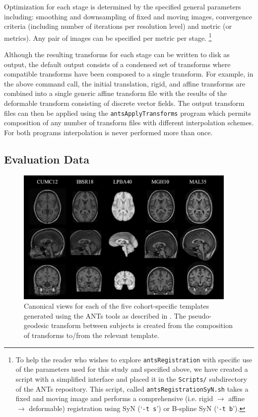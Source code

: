 \documentclass{frontiersSCNS}
\begin{document}
Optimization for each stage is determined by the specified general parameters 
including: smoothing and downsampling of fixed and moving images, convergence
criteria (including number of iterations per resolution level) and metric (or
metrics).  Any pair of images can be specified per metric per stage.%
\footnote{
To help the reader who wishes to explore {\tt antsRegistration} with specific use of the
parameters used for this study and specified above, we have created a script with a simplified interface and placed it in the {\tt Scripts/} subdirectory of the ANTs repository.  This script, called {\tt antsRegistrationSyN.sh} takes a fixed and moving image and performs a comprehensive (i.e. rigid $\rightarrow$ affine $\rightarrow$ deformable) registration using SyN (`{\tt -t s}') or B-spline SyN (`{\tt -t b}').
}  

Although the
resulting transforms for each stage can be written to disk as output, the 
default output consists of a condensed set of transforms where compatible 
transforms have been composed to a single transform.  For example, in the
above command call, the initial translation, rigid, and affine transforms are
combined into a single generic affine transform file with the results of the
deformable transform consisting of discrete vector fields.  The output
transform files can then be applied using the {\tt antsApplyTransforms}
program which permits composition of any number of transform files with 
different interpolation schemes.   For both programs interpolation is never
performed more than once. 

\subsection{Evaluation Data}

\begin{figure}[htb]
  \centering
  \includegraphics[width=0.95\textwidth]{templates.jpg}
  \caption{Canonical views for each of the five cohort-specific templates generated using
  the ANTs tools as described
  in \cite{avants2010}.   The pseudo-geodesic transform between subjects is created from 
  the composition of transforms to/from the relevant template.
  }
  \label{fig:templates}
\end{figure}
\end{document}
